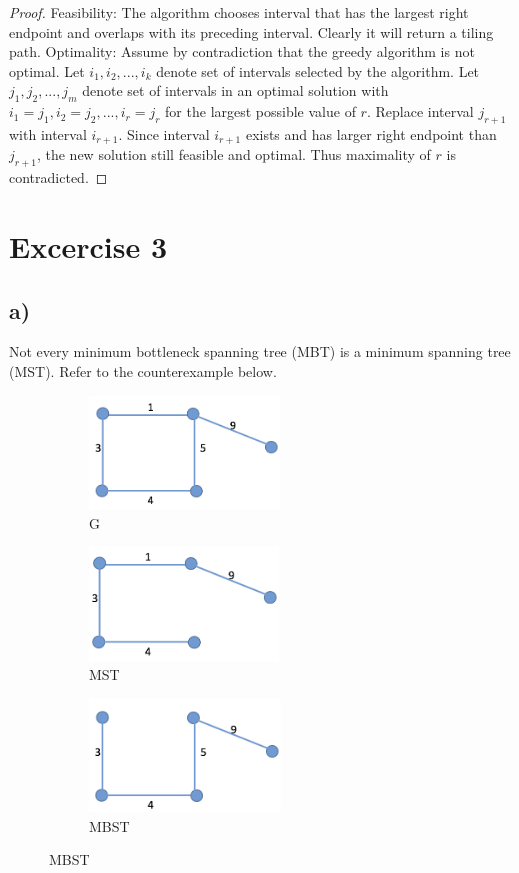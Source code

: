 \documentclass[a4paper,10pt,twoside]{article}
\newtheorem{proof}{Proof}
\begin{document}
\begin{proof}
	Feasibility: The algorithm chooses interval that has the largest right endpoint and overlaps with 		its preceding interval. Clearly it will return a tiling path.
	Optimality: Assume by contradiction that the greedy algorithm is not optimal.
	Let $i_{1}, i_{2}, . . . , i_{k}$ denote set of intervals selected by the algorithm.
	Let $j_{1}, j_{2}, . . . , j_{m}$ denote set of intervals in an optimal solution with 
	$i_{1} = j_{1}, i_{2} = j_{2}, . . . , i_{r} = j_{r}$ for the largest possible value of $r$.
	Replace interval $j_{r+1}$ with interval $i_{r+1}$. Since interval $i_{r+1}$ exists and has larger 			right endpoint than $j_{r+1}$, the new solution still feasible and optimal. 
	Thus maximality of $r$ is contradicted.

\end{proof}

\section*{Excercise 3}
\subsection*{a)}
Not every minimum bottleneck spanning tree (MBT) is a minimum spanning tree (MST).
Refer to the counterexample below. 
\begin{figure}[h]
 
\begin{subfigure}{0.3\textwidth}
\includegraphics[width=0.9\linewidth, height=3cm]{G} 
\caption{G}
\label{fig:subim1}
\end{subfigure}
\begin{subfigure}{0.3\textwidth}
\includegraphics[width=0.9\linewidth, height=3cm]{MST}
\caption{MST}
\label{fig:subim2}
\end{subfigure}
 \begin{subfigure}{0.3\textwidth}
\includegraphics[width=0.9\linewidth, height=3cm]{MBST}
\caption{MBST}
\label{fig:subim3}
\end{subfigure}
\end{figure}
\end{document}
